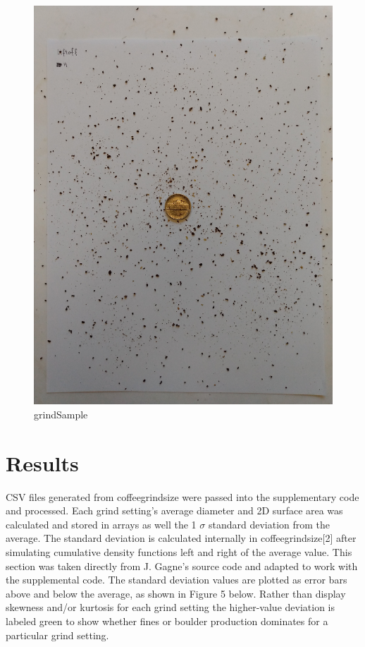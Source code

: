 \documentclass[10pt,a4paper,twocolumn,notitlepage]{article}
\begin{document}
\begin{center}\begin{figure}
\includegraphics[width=\columnwidth]{postAdjustmentData/IMG_20191005_144811062.jpg}\caption{grindSample}\label{fig:grindSample}\end{figure}\end{center}

\section{Results}
CSV files generated from coffeegrindsize were passed into the supplementary code and processed. Each grind setting's average diameter and 2D surface area was calculated and stored in arrays as well the 1 $\sigma$ standard deviation from the average. The standard deviation is calculated internally in coffeegrindsize[2] after simulating cumulative density functions left and right of the average value. This section was taken directly from J. Gagne's source code and adapted to work with the supplemental code. The standard deviation values are plotted as error bars above and below the average, as shown in Figure 5 below. Rather than display skewness and/or kurtosis for each grind setting the higher-value deviation is labeled green to show whether fines or boulder production dominates for a particular grind setting.\\
\end{document}
